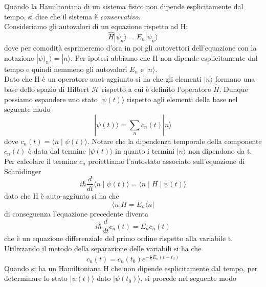 Quando la Hamiltoniana di un sistema fisico non dipende esplicitamente dal tempo, si dice che il sistema \`e \textit{conservativo}.
\\

\noindent Consideriamo gli autovalori di un equazione rispetto ad H:
\begin{equation*}
	\hat{H} | \psi_n \rangle = E_n |\psi_n \rangle  
\end{equation*}
dove per comodit\`a esprimeremo d'ora in poi gli autovettori dell'equazione con la notazione $|\psi)_n \rangle = |n \rangle $. Per ipotesi abbiamo che H non dipende esplicitamente dal tempo e  quindi nemmeno gli autovalori $E_n$ e $|n \rangle $.
\\
Dato che H \`e un operatore auot-aggiunto si ha che gli elementi $|n \rangle$ formano una base dello spazio di Hilbert $\mathcal{H}$ rispetto a cui \`e definito l'operatore $\hat{H}$. Dunque possiamo espandere uno stato $|\psi(t) \rangle $ rispetto agli elementi della base nel seguente modo
\begin{equation*}
	|\psi(t) \rangle = \sum_{n}c_n(t) |n \rangle 
\end{equation*}
dove $c_n (t) = \langle n \mid \psi(t) \rangle $. Notare che la dipendenza temporale della componente $c_n(t)$ \`e data dal termine $|\psi(t) \rangle$ in quanto i termini $|n \rangle$ non dipendono da t. Per calcolare il termine $c_n$ proiettiamo l'autostato associato sull'equazione di Schr\"odinger 
\begin{equation*}
	i \hbar \frac{d}{dt} \langle n \mid \psi(t) \rangle = \langle n \mid H \mid \psi(t) \rangle 
\end{equation*}
dato che H \`e auto-aggiunto si ha che 
\begin{equation*}
	\langle n| H  = E_n \langle n | 
\end{equation*}
di conseguenza l'equazione precedente diventa 
\begin{equation*}
	i\hbar \frac{d}{dt}c_n(t) = E_n c_n(t)
\end{equation*}
che \`e un equazione differenziale del primo ordine rispetto alla variabile t. Utilizzando il metodo della separazione delle variabili si ha che 
\begin{equation*}
	c_n(t) = c_n(t_0)e^{-\frac{i}{\hbar}E_n(t-t_0)}
\end{equation*}
Quando si ha un Hamiltoniana H che non dipende esplicitamente dal tempo, per determinare lo stato $|\psi(t) \rangle $ dato $|\psi(t_0) \rangle $, si procede nel seguente modo
